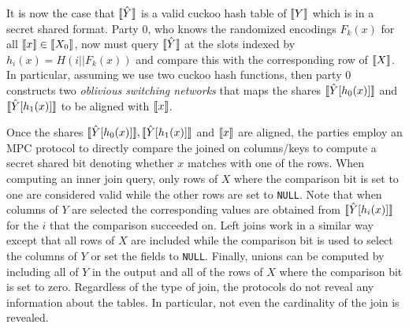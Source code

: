 It is now the case that $\llbracket \hat Y\rrbracket$ is a valid cuckoo hash table of $\llbracket Y\rrbracket$ which is in a secret shared format. Party 0, who knows the randomized encodings $F_k(x)$ for all $\llbracket x\rrbracket\in \llbracket X_0\rrbracket$, now must query $\llbracket \hat Y\rrbracket$ at the slots indexed by $h_i(x)= H( i || F_k(x))$ and compare this with the corresponding row of $\llbracket X\rrbracket$. In particular, assuming we use two cuckoo hash functions, then party 0 constructs two \emph{oblivious switching networks} that maps the shares $\llbracket \hat Y[{h_0(x)}]\rrbracket$ and $\llbracket \hat Y[{h_1(x)}]\rrbracket$ to be aligned with $\llbracket x\rrbracket$.

Once the shares  $\llbracket \hat Y[{h_0(x)}]\rrbracket, \llbracket \hat Y[{h_1(x)}]\rrbracket$ and $\llbracket x\rrbracket$ are aligned, the parties employ an MPC protocol to directly compare the joined on columns/keys to compute a secret shared bit denoting whether $x$ matches with one of the rows. When computing an inner join query, only rows of $X$ where the comparison bit is set to one are considered valid while the other rows are set to \texttt{NULL}. Note that when columns of $Y$ are selected the corresponding values are obtained from $\llbracket \hat Y[{h_i(x)}]\rrbracket$ for the $i$ that the comparison succeeded on. Left joins work in a similar way except that all rows of $X$ are included while the comparison bit is used to select the columns of $Y$ or set the fields to \texttt{NULL}. Finally, unions can be computed by including all of $Y$ in the output and all of the rows of $X$ where the comparison bit is set to zero. Regardless of the type of join, the protocols do not reveal any information about the tables. In particular, not even the cardinality of the join is revealed.

